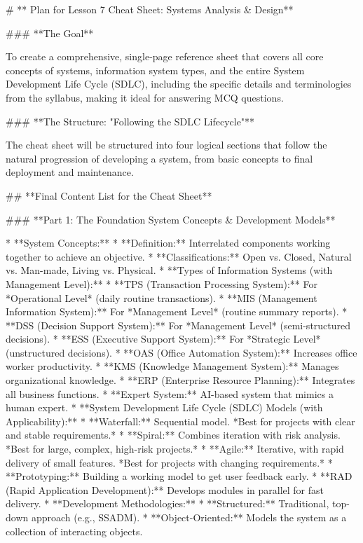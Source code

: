 # ** Plan for Lesson 7 Cheat Sheet: Systems Analysis & Design**

### **The Goal**

To create a comprehensive, single-page reference sheet that covers all core concepts of systems, information system types, and the entire System Development Life Cycle (SDLC), including the specific details and terminologies from the syllabus, making it ideal for answering MCQ questions.

### **The Structure: "Following the SDLC Lifecycle"**

The cheat sheet will be structured into four logical sections that follow the natural progression of developing a system, from basic concepts to final deployment and maintenance.

## **Final Content List for the Cheat Sheet**

### **Part 1: The Foundation \- System Concepts & Development Models**

* **System Concepts:**  
  * **Definition:** Interrelated components working together to achieve an objective.  
  * **Classifications:** Open vs. Closed, Natural vs. Man-made, Living vs. Physical.  
* **Types of Information Systems (with Management Level):**  
  * **TPS (Transaction Processing System):** For *Operational Level* (daily routine transactions).  
  * **MIS (Management Information System):** For *Management Level* (routine summary reports).  
  * **DSS (Decision Support System):** For *Management Level* (semi-structured decisions).  
  * **ESS (Executive Support System):** For *Strategic Level* (unstructured decisions).  
  * **OAS (Office Automation System):** Increases office worker productivity.  
  * **KMS (Knowledge Management System):** Manages organizational knowledge.  
  * **ERP (Enterprise Resource Planning):** Integrates all business functions.  
  * **Expert System:** AI-based system that mimics a human expert.  
* **System Development Life Cycle (SDLC) Models (with Applicability):**  
  * **Waterfall:** Sequential model. *Best for projects with clear and stable requirements.*  
  * **Spiral:** Combines iteration with risk analysis. *Best for large, complex, high-risk projects.*  
  * **Agile:** Iterative, with rapid delivery of small features. *Best for projects with changing requirements.*  
  * **Prototyping:** Building a working model to get user feedback early.  
  * **RAD (Rapid Application Development):** Develops modules in parallel for fast delivery.  
* **Development Methodologies:**  
  * **Structured:** Traditional, top-down approach (e.g., SSADM).  
  * **Object-Oriented:** Models the system as a collection of interacting objects.

